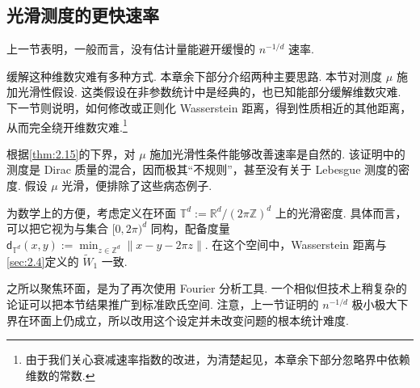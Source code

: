 \subsection{光滑测度的更快速率}\label{sec:2.7}
上一节表明，一般而言，没有估计量能避开缓慢的 $n^{-1/d}$ 速率.

缓解这种维数灾难有多种方式. 本章余下部分介绍两种主要思路. 本节对测度 $\mu$ 施加光滑性假设. 这类假设在非参数统计中是经典的，也已知能部分缓解维数灾难. 下一节则说明，如何修改或正则化 Wasserstein 距离，得到性质相近的其他距离，从而完全绕开维数灾难.\footnote{由于我们关心衰减速率指数的改进，为清楚起见，本章余下部分忽略界中依赖维数的常数.}

根据\autoref{thm:2.15}的下界，对 $\mu$ 施加光滑性条件能够改善速率是自然的. 该证明中的测度是 Dirac 质量的混合，因而极其“不规则”，甚至没有关于 Lebesgue 测度的密度. 假设 $\mu$ 光滑，便排除了这些病态例子.

为数学上的方便，考虑定义在环面 $\mathbb T^d:=\mathbb R^d/(2\pi\mathbb Z)^d$ 上的光滑密度. 具体而言，可以把它视为与集合 $[0,2\pi)^d$ 同构，配备度量 $\mathsf d_{\mathbb T^d}(x,y):=\min_{z\in\mathbb Z^d}\lVert x-y-2\pi z\rVert$. 在这个空间中，Wasserstein 距离与\autoref{sec:2.4}定义的 $\widetilde W_1$ 一致.

之所以聚焦环面，是为了再次使用 Fourier 分析工具. 一个相似但技术上稍复杂的论证可以把本节结果推广到标准欧氏空间. 注意，上一节证明的 $n^{-1/d}$ 极小极大下界在环面上仍成立，所以改用这个设定并未改变问题的根本统计难度.

